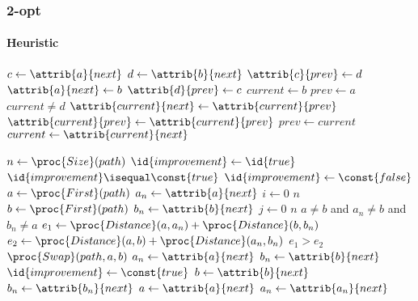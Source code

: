 \subsubsection{2-opt}
\label{sec:2-opt}
\paragraph{Heuristic}
\begin{codebox}
\li $c \gets \attrib{a}{next}$
\li $d \gets \attrib{b}{next}$
\li $\attrib{c}{prev} \gets d$ 
\li $\attrib{a}{next} \gets b$
\li $\attrib{d}{prev} \gets c$ 
\li $current \gets b$
\li $prev \gets a$
\li \While $current \neq d$
\li     \Do
            $\attrib{current}{next} \gets \attrib{current}{prev}$
\li         $\attrib{current}{prev} \gets \attrib{current}{prev}$
\li         $prev \gets current$
\li         $current \gets \attrib{current}{next}$ 
        \End
\end{codebox}
\begin{codebox}
\li $n \gets \proc{Size}(path)$
\li $\id{improvement} \gets \id{true}$
\li \While $\id{improvement} \isequal \const{true}$
\li     \Do
            $\id{improvement} \gets \const{false}$
\li         $a \gets \proc{First}(path)$
\li         $a_n \gets \attrib{a}{next}$
\li         \For $i \gets 0$ \To $n$
\li             \Do
                    $b \gets \proc{First}(path)$    
\li                 $b_n \gets \attrib{b}{next}$
\li                 \For $j \gets 0$ \To $n$
\li                     \Do
                            \If $a \neq b$ and
                                $a_n \neq b$ and
                                $b_n \neq a$ \label{li:2opt:c1}
\li                             \Then
                                    $e_1 \gets \proc{Distance}(a, a_n) +
                                               \proc{Distance}(b, b_n)$
\li                                 $e_2 \gets \proc{Distance}(a, b) +
                                               \proc{Distance}(a_n, b_n)$
\li                                 \If $e_1 > e_2$ \label{li:2opt:c2}
\li                                     \Then
                                            $\proc{Swap}(path, a, b)$
\li                                         $a_n \gets \attrib{a}{next}$
\li                                         $b_n \gets \attrib{b}{next}$
\li                                         $\id{improvement} \gets
                                             \const{true}$
                                        \End
                                \End
\li                     $b \gets \attrib{b}{next}$
\li                     $b_n \gets \attrib{b_n}{next}$
                        \End
\li             $a \gets \attrib{a}{next}$
\li             $a_n \gets \attrib{a_n}{next}$
                \End
        \End
\end{codebox}

